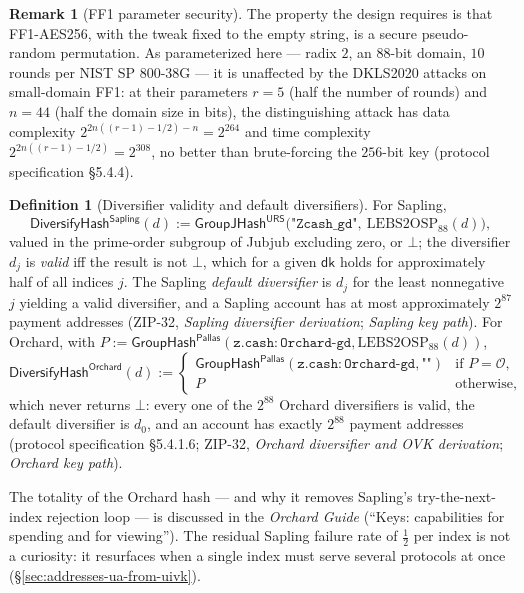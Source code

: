 \documentclass[11pt,a4paper]{article}
\theoremstyle{definition}
\newtheorem{definition}[theorem]{Definition}
\newtheorem{remark}[theorem]{Remark}
\newcommand{\Pallas}{\ensuremath{\mathsf{Pallas}}}
\newcommand{\GroupHash}{\ensuremath{\mathsf{GroupHash}}}
\newcommand{\dk}{\ensuremath{\mathsf{dk}}}
\begin{document}
\begin{remark}[FF1 parameter security]\label{rem:ff1-security}
The property the design requires is that FF1-AES256, with the tweak fixed
to the empty string, is a secure pseudo-random permutation. As
parameterized here --- radix $2$, an $88$-bit domain, $10$ rounds per NIST
SP 800-38G --- it is unaffected by the DKLS2020 attacks on small-domain
FF1: at their parameters $r = 5$ (half the number of rounds) and $n = 44$
(half the domain size in bits), the distinguishing attack has
data complexity $2^{2n((r-1)-1/2)-n} = 2^{264}$ and time complexity
$2^{2n((r-1)-1/2)} = 2^{308}$, no better than brute-forcing the $256$-bit
key (protocol specification \S5.4.4).
\end{remark}

\begin{definition}[Diversifier validity and default diversifiers]\label{def:diversifier-validity}
For Sapling,
\[
\mathsf{DiversifyHash}^{\mathsf{Sapling}}(d) :=
\mathsf{GroupJHash^{URS}}\bigl(\texttt{"Zcash\_gd"},\
\mathrm{LEBS2OSP}_{88}(d)\bigr),
\]
valued in the prime-order subgroup of Jubjub excluding zero, or $\bot$; the
diversifier $d_j$ is \emph{valid} iff the result is not $\bot$, which for a
given $\dk$ holds for approximately half of all indices $j$. The Sapling
\emph{default diversifier} is $d_j$ for the least nonnegative $j$ yielding
a valid diversifier, and a Sapling account has at most approximately
$2^{87}$ payment addresses (ZIP-32, \emph{Sapling diversifier derivation};
\emph{Sapling key path}). For Orchard, with
$P := \GroupHash^{\Pallas}(\mathtt{z.cash:Orchard\text{-}gd},
\mathrm{LEBS2OSP}_{88}(d))$,
\[
\mathsf{DiversifyHash}^{\mathsf{Orchard}}(d) :=
\begin{cases}
\GroupHash^{\Pallas}(\mathtt{z.cash:Orchard\text{-}gd}, \texttt{""})
  & \text{if } P = \mathcal{O}, \\
P & \text{otherwise,}
\end{cases}
\]
which never returns $\bot$: every one of the $2^{88}$ Orchard diversifiers
is valid, the default diversifier is $d_0$, and an account has exactly
$2^{88}$ payment addresses (protocol specification \S5.4.1.6; ZIP-32,
\emph{Orchard diversifier and OVK derivation}; \emph{Orchard key path}).
\end{definition}

The totality of the Orchard hash --- and why it removes Sapling's
try-the-next-index rejection loop --- is discussed in the \emph{Orchard
Guide} (``Keys: capabilities for spending and for viewing''). The residual
Sapling failure rate of $\tfrac12$ per index is not a curiosity: it
resurfaces when a single index must serve several protocols at once
(\S\ref{sec:addresses-ua-from-uivk}).
\end{document}
